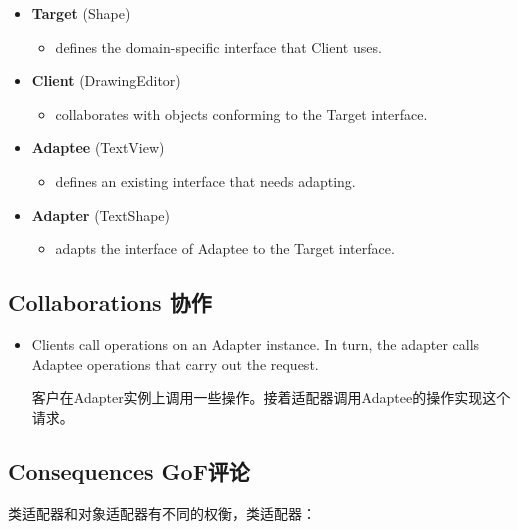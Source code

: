 \begin{itemize}

\item \textbf{Target} (Shape)

	\begin{itemize}
		\item defines the domain-specific interface that Client uses.
	\end{itemize}

\item \textbf{Client} (DrawingEditor)

	\begin{itemize}
		\item collaborates with objects conforming to the Target interface.
	\end{itemize}

\item \textbf{Adaptee} (TextView)

	\begin{itemize}
		\item defines an existing interface that needs adapting.
	\end{itemize}

\item \textbf{Adapter} (TextShape)

	\begin{itemize}
		\item adapts the interface of Adaptee to the Target interface.
	\end{itemize}

\end{itemize}

\subsection{Collaborations 协作}

\begin{itemize}
	\item Clients call operations on an Adapter instance. In turn, the adapter calls Adaptee operations that carry out the request.

	客户在Adapter实例上调用一些操作。接着适配器调用Adaptee的操作实现这个请求。
\end{itemize}

\subsection{Consequences GoF评论}

类适配器和对象适配器有不同的权衡，类适配器：

